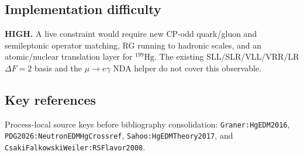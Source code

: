 \subsection*{Implementation difficulty}
\textbf{HIGH.}  A live constraint would require new CP-odd quark/gluon and
semileptonic operator matching, RG running to hadronic scales, and an
atomic/nuclear translation layer for \(^{199}\mathrm{Hg}\).  The existing
SLL/SLR/VLL/VRR/LR \(\Delta F=2\) basis and the \(\mu\to e\gamma\) NDA helper
do not cover this observable.

\subsection*{Key references}
Process-local source keys before bibliography consolidation:
\texttt{Graner:HgEDM2016}, \texttt{PDG2026:NeutronEDMHgCrossref},
\texttt{Sahoo:HgEDMTheory2017}, and
\texttt{CsakiFalkowskiWeiler:RSFlavor2008}.
